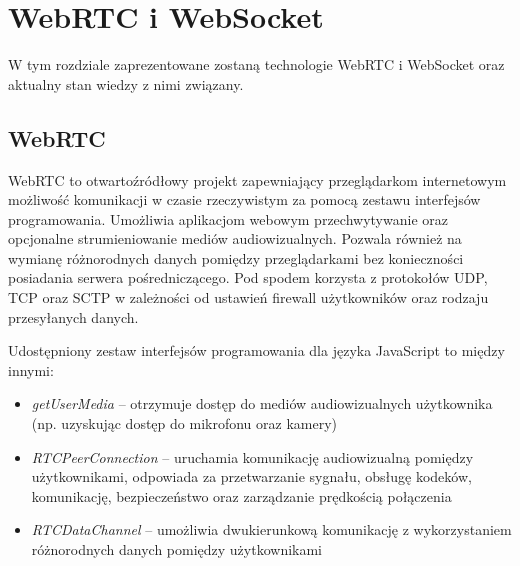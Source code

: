 \documentclass[language=polish,type=master]{aghmodern}
\begin{document}
\chapter{WebRTC i WebSocket}
W tym rozdziale zaprezentowane zostaną technologie WebRTC i WebSocket oraz aktualny stan wiedzy z nimi związany.

\section{WebRTC}
WebRTC to otwartoźródłowy projekt zapewniający przeglądarkom internetowym możliwość komunikacji w czasie rzeczywistym za pomocą zestawu interfejsów programowania.
Umożliwia aplikacjom webowym przechwytywanie oraz opcjonalne strumieniowanie mediów audiowizualnych.
Pozwala również na wymianę różnorodnych danych pomiędzy przeglądarkami bez konieczności posiadania serwera pośredniczącego.
Pod spodem korzysta z protokołów UDP, TCP oraz SCTP w zależności od ustawień firewall użytkowników oraz rodzaju przesyłanych danych.

Udostępniony zestaw interfejsów programowania dla języka JavaScript to między innymi:

\begin{itemize}
    \item \emph{getUserMedia} -- otrzymuje dostęp do mediów audiowizualnych użytkownika (np. uzyskując dostęp do mikrofonu oraz kamery)
    \item \emph{RTCPeerConnection} -- uruchamia komunikację audiowizualną pomiędzy użytkownikami, odpowiada za przetwarzanie sygnału, obsługę kodeków, komunikację, bezpieczeństwo oraz zarządzanie prędkością połączenia
    \item \emph{RTCDataChannel} -- umożliwia dwukierunkową komunikację z wykorzystaniem różnorodnych danych pomiędzy użytkownikami
\end{itemize}
\end{document}
